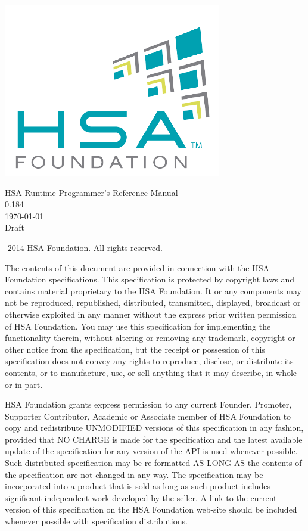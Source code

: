 \documentclass[final]{book}
\newcommand{\doctitle}{HSA Runtime Programmer's Reference Manual}
\newcommand{\docversion}{0.184}
\begin{document}
\hypersetup{pageanchor=false,citecolor=black}
\begin{titlepage}
\includegraphics[width=.5\textwidth]{fig/foundation.png}
\vspace*{7cm}
\begin{center}
{\Large \doctitle\\[1ex]\large\docversion}\\
\vspace*{1cm}
\vspace*{0.5cm}
{\small \today}\\
\vspace*{0.5cm}
{\small Draft}\\
\end{center}
\end{titlepage}
\thispagestyle{empty} {-2014 HSA Foundation. All rights
  reserved.}


The contents of this document are provided in connection with the HSA Foundation
specifications. This specification is protected by copyright laws and contains
material proprietary to the HSA Foundation. It or any components may not be
reproduced, republished, distributed, transmitted, displayed, broadcast or
otherwise exploited in any manner without the express prior written permission
of HSA Foundation. You may use this specification for implementing the
functionality therein, without altering or removing any trademark, copyright or
other notice from the specification, but the receipt or possession of this
specification does not convey any rights to reproduce, disclose, or distribute
its contents, or to manufacture, use, or sell anything that it may describe, in
whole or in part.

HSA Foundation grants express permission to any current Founder, Promoter,
Supporter Contributor, Academic or Associate member of HSA Foundation to copy
and redistribute UNMODIFIED versions of this specification in any fashion,
provided that NO CHARGE is made for the specification and the latest available
update of the specification for any version of the API is used whenever
possible. Such distributed specification may be re-formatted AS LONG AS the
contents of the specification are not changed in any way. The specification may
be incorporated into a product that is sold as long as such product includes
significant independent work developed by the seller. A link to the current
version of this specification on the HSA Foundation web-site should be included
whenever possible with specification distributions.
\end{document}
